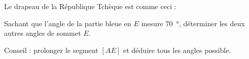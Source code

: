 
\begin{exercice}\label{exo2smath-0239}

    Le drapeau de la République Tchèque est comme ceci :
    \begin{center}

    \end{center}
    Sachant que l'angle de la partie bleue en \( E\) mesure \SI{70}{\degree}, déterminer les deux autres angles de sommet \( E\).
    
    Conseil : prolonger le segment \( [AE]\) et déduire tous les angles possible.    

\end{exercice}

